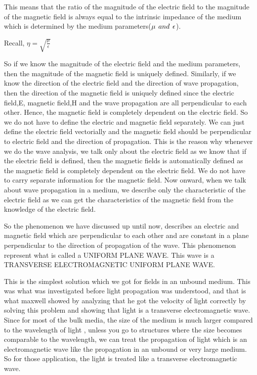 This means that the ratio of the magnitude of the electric field to the magnitude of the magnetic field is always equal to the intrinsic impedance of the medium which is determined by the medium parameters($\mu \hspace{0.15cm} and\hspace{0.15cm} \epsilon$).
\begin{center}
	Recall, $\eta = \sqrt{\frac{\mu}{\epsilon}}$
\end{center}
So if we know the magnitude of the electric field and the medium parameters, then the magnitude of the magnetic field is uniquely defined. Similarly, if we know the direction of the electric field and the direction of wave propagation, then the direction of the magnetic field is uniquely defined since the electric field,E, magnetic field,H and the wave propagation are all perpendicular to each other. 
Hence, the magnetic field is completely dependent on the electric field. So we do not have to define the electric and magnetic field separately.
We can just define the electric field vectorially and the magnetic field should be perpendicular to electric field and the direction of propagation. This is the reason why whenever we do the wave analysis, we talk only about the electric field as we know that if the electric field is defined, then the magnetic fields is automatically defined as the magnetic field is completely dependent on the electric field. We do not have to carry separate information for the magnetic field. Now onward, when we talk about wave propagation in a medium, we describe only the characteristic of the electric field as we can get the characteristics of the magnetic field from the knowledge of the electric field.

So the phenomenon we have discussed up until now, describes an electric and magnetic field which are perpendicular to each other and are constant in a plane perpendicular to the direction of propagation of the wave. This phenomenon represent what is called a UNIFORM PLANE WAVE. This wave is a TRANSVERSE ELECTROMAGNETIC UNIFORM PLANE WAVE.

This is the simplest solution which we got for fields in an unbound medium. This was what was investigated before light propagation was understood, and that is what maxwell showed by analyzing that he got the velocity of light correctly by solving this problem and showing that light is a transverse electromagnetic wave. Since for most of the bulk media, the size of the medium is much larger compared to the wavelength of light , unless you go to structures where the size becomes comparable to the wavelength, we can treat the propagation of light which is an electromagnetic wave like the propagation in an unbound or very large medium. So for those application, the light is treated like a transverse electromagnetic wave. 


